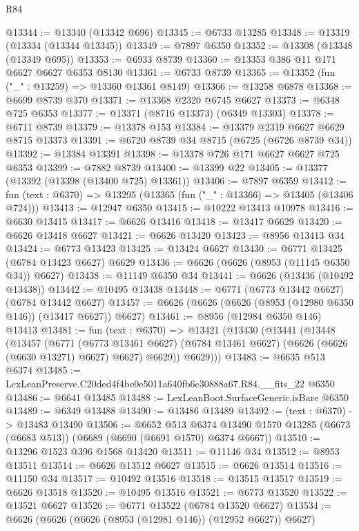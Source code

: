 \begin{lexlean}{R84}
\begin{coremodule}
@13344 := @13340 (@13342 @696)
@13345 := @6733 @13285
@13348 := @13319 (@13334 (@13344 @13345))
@13349 := @7897 @6350
@13352 := @13308 (@13348 (@13349 @695))
@13353 := @6933 @8739
@13360 := @13353 @386 @11 @171 @6627 @6627 @6353 @8130
@13361 := @6733 @8739
@13365 := @13352 (fun ("_" : @13259) => @13360 @13361 @8149)
@13366 := @13258 @6878
@13368 := @6699 @8739 @370
@13371 := @13368 @2320 @6745 @6627
@13373 := @6348 @725 @6353
@13377 := @13371 (@8716 @13373) (@6349 @13303)
@13378 := @6711 @8739
@13379 := @13378 @153
@13384 := @13379 @2319 @6627 @6629 @8715 @13373
@13391 := @6720 @8739 @34 @8715 (@6725 (@6726 @8739 @34))
@13392 := @13384 @13391
@13398 := @13378 @726 @171 @6627 @6627 @725 @6353
@13399 := @7882 @8739
@13400 := @13399 @22
@13405 := @13377 (@13392 (@13398 (@13400 @725) @13361))
@13406 := @7897 @6359
@13412 := fun (text : @6370) => @13295 (@13365 (fun ("_" : @13366) => @13405 (@13406 @724)))
@13413 := @12947 @6350
@13415 := @10222 @13413 @10978
@13416 := @6630 @13415
@13417 := @6626 @13416
@13418 := @13417 @6629
@13420 := @6626 @13418 @6627
@13421 := @6626 @13420
@13423 := @8956 @13413 @34
@13424 := @6773 @13423
@13425 := @13424 @6627
@13430 := @6771 @13425 (@6784 @13423 @6627) @6629
@13436 := @6626 (@6626 (@8953 (@11145 @6350 @34)) @6627)
@13438 := @11149 @6350 @34
@13441 := @6626 (@13436 (@10492 @13438))
@13442 := @10495 @13438
@13448 := @6771 (@6773 @13442 @6627) (@6784 @13442 @6627)
@13457 := @6626 (@6626 (@6626 (@8953 (@12980 @6350 @146)) (@13417 @6627)) @6627)
@13461 := @8956 (@12984 @6350 @146) @13413
@13481 := fun (text : @6370) =>
  @13421
    (@13430
      (@13441
        (@13448
          (@13457
            (@6771
              (@6773 @13461 @6627)
              (@6784 @13461 @6627)
              (@6626 (@6626 (@6630 @13271) @6627) @6627)
              @6629))
          @6629)))
@13483 := @6635 @513 @6374
@13485 := LexLeanPreserve.C20ded4f4be0e5011a640fb6c30888a67.R84.__fits_22 @6350
@13486 := @6641 @13485
@13488 := LexLeanBoot.SurfaceGeneric.isBare @6350
@13489 := @6349 @13488
@13490 := @13486 @13489
@13492 := (text : @6370) -> @13483 @13490
@13506 := @6652
    @513
    @6374
    @13490
    @1570
    @13285
    (@6673 (@6683 @513))
    (@6689 (@6690 (@6691 @1570) @6374 @6667))
@13510 := @13296 @1523 @396 @1568 @13420
@13511 := @11146 @34
@13512 := @8953 @13511
@13514 := @6626 @13512 @6627
@13515 := @6626 @13514
@13516 := @11150 @34
@13517 := @10492 @13516
@13518 := @13515 @13517
@13519 := @6626 @13518
@13520 := @10495 @13516
@13521 := @6773 @13520
@13522 := @13521 @6627
@13526 := @6771 @13522 (@6784 @13520 @6627)
@13534 := @6626 (@6626 (@6626 (@8953 (@12981 @146)) (@12952 @6627)) @6627)

\end{coremodule}
\end{lexlean}
